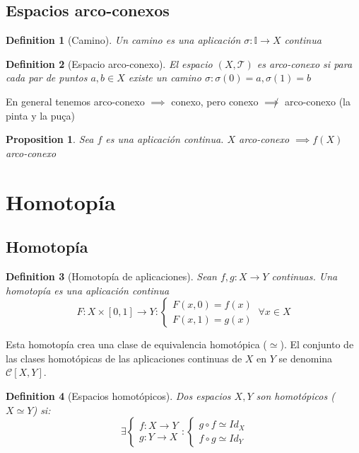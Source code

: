 \documentclass[leqno]{article}
\newtheorem*{definition}{Definition}
\newtheorem*{proposition}{Proposition}
\begin{document}
\subsection{Espacios arco-conexos}
\begin{definition}[Camino] Un camino es una aplicación $\sigma :\mathbb{I} \to X$ continua
\end{definition}

\begin{definition}[Espacio arco-conexo] El espacio $(X, \mathcal{T})$ es arco-conexo si para cada par de puntos $a, b \in X$ existe un camino $\sigma : \sigma (0)=a, \sigma (1)=b$
\end{definition}

En general tenemos arco-conexo $\implies$ conexo, pero conexo $\not\implies$ arco-conexo (la pinta y la puça)

\begin{proposition}
Sea $f$ es una aplicación continua. $X$ arco-conexo  $\implies f(X)$ arco-conexo
\end{proposition}



\section{Homotopía}

\subsection{Homotopía}
\begin{definition}[Homotopía de aplicaciones]
  Sean $f, g: X \to Y$ continuas. Una homotopía es una aplicación continua 
  \[
  F:X\times [0, 1] \to  Y : \begin{cases}
    F(x, 0) = f(x) \\
	F(x, 1) = g(x)
  \end{cases} \ \forall x \in X
  \] 
\end{definition}

Esta homotopía crea una clase de equivalencia homotópica ($\simeq$). El conjunto de las clases homotópicas de las aplicaciones continuas de  $X$ en  $Y$ se denomina  $\mathcal{C}[X, Y]$.

\begin{definition}[Espacios homotópicos]
  Dos espacios $X, Y$ son homotópicos ($X\simeq Y$) si:
   \[
  \ \exists \begin{cases}
    f: X \to Y\\
    g: Y \to  X
  \end{cases}
  :
  \begin{cases}
    g\circ f \simeq Id_X \\
	f\circ g \simeq Id_Y
  \end{cases}
  \] 
\end{definition}
\end{document}
